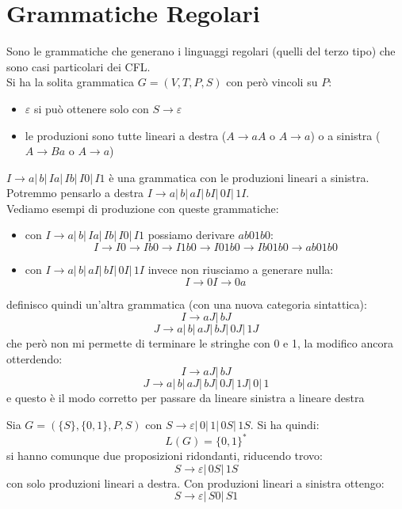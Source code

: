 \documentclass[a4paper,12pt, oneside]{book}
\begin{document}
\section{Grammatiche Regolari}
Sono le grammatiche che generano i linguaggi regolari (quelli del terzo tipo) che sono casi particolari dei CFL.\\
Si ha la solita grammatica $G = (V, T, P, S)$ con però vincoli su $P$:
\begin{itemize}
	\item $\varepsilon$ si può ottenere solo con $S\to \varepsilon$
	\item le produzioni sono tutte lineari a destra ($A\to aA$ o $A\to a$) o a sinistra ($A\to Ba$ o $A\to a$)
\end{itemize}
\begin{esempio}
	$I\to a|\,b|\,Ia|\,Ib|\,I0|\,I1$ è una grammatica con le produzioni lineari a sinistra.\\
	Potremmo pensarlo a destra $I\to a|\,b|\,aI|\,bI|\,0I|\,1I$.\\
	Vediamo esempi di produzione con queste grammatiche:
	\begin{itemize}
		\item con $I\to a|\,b|\,Ia|\,Ib|\,I0|\,I1$ possiamo derivare $ab01b0$:
		      $$I\to I0\to Ib0\to I1b0\to I01b0\to Ib01b0\to ab01b0$$
		\item con $I\to a|\,b|\,aI|\,bI|\,0I|\,1I$ invece non riusciamo a generare nulla:
		      $$I\to 0I\to 0a$$
	\end{itemize}
	definisco quindi un'altra grammatica (con una nuova categoria sintattica):
	$$I\to aJ|\, bJ$$
	$$J\to a|\,b|\,aJ|\,bJ|\,0J|\,1J$$
	che però non mi permette di terminare le stringhe con 0 e 1, la modifico ancora otterdendo:
	$$I\to aJ|\, bJ$$
	$$J\to a|\,b|\,aJ|\,bJ|\,0J|\,1J|\,0|\,1$$
	e questo è il modo corretto per passare da lineare sinistra a lineare destra
\end{esempio}
\begin{esempio}
	Sia $G=(\{S\},\{0,1\},P,S)$ con $S\to \varepsilon|\,0|\,1|\,0S|\,1S$. Si ha quindi:
	$$L(G)=\{0,1\}^*$$
	si hanno comunque due proposizioni ridondanti, riducendo trovo:
	$$S\to \varepsilon|\, 0S|\,1S$$
	con solo produzioni lineari a destra. Con produzioni lineari a sinistra ottengo:
	$$S\to \varepsilon|\, S0|\,S1$$
\end{esempio}
\end{document}
